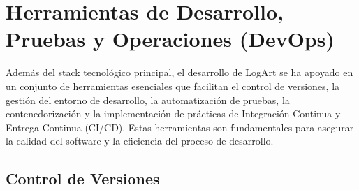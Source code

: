 \section{Herramientas de Desarrollo, Pruebas y Operaciones (DevOps)}
\label{sec:herramientasDevOps}

Además del stack tecnológico principal, el desarrollo de LogArt se ha apoyado en un conjunto de herramientas esenciales que facilitan el control de versiones, la gestión del entorno de desarrollo, la automatización de pruebas, la contenedorización y la implementación de prácticas de Integración Continua y Entrega Continua (CI/CD). Estas herramientas son fundamentales para asegurar la calidad del software y la eficiencia del proceso de desarrollo.

\subsection{Control de Versiones}
\label{sec:controlVersiones}

